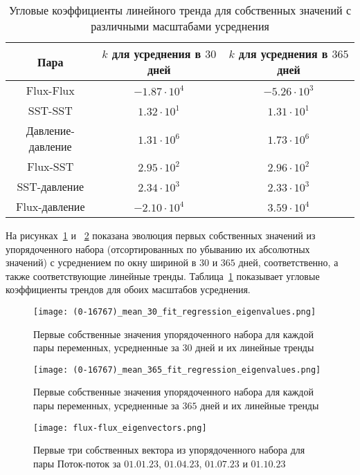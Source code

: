 \begin{table}
	\caption{Угловые коэффициенты линейного тренда для собственных значений с различными масштабами усреднения }
	\centering
	\begin{tabular}{|c|c|c|}
		\hline
		Пара & $k$ для усреднения в $30$ дней & $k$ для усреднения в $365$ дней\\
		\hline
		Flux-Flux & $-1.87 \cdot 10^{4}$ & $-5.26 \cdot 10^{3}$ \\
		SST-SST & $1.32 \cdot 10^{1}$ & $1.31 \cdot 10^{1}$ \\
		Давление-давление & $1.31 \cdot 10^{6}$ & $1.73 \cdot 10^{6}$ \\
		Flux-SST & $2.95 \cdot 10^{2}$ & $2.96 \cdot 10^{2}$ \\
		SST-давление & $2.34 \cdot 10^{3}$ & $2.33 \cdot 10^{3}$ \\
		Flux-давление & $-2.10 \cdot 10^{4}$ & $3.59 \cdot 10^{4}$ \\
		\hline
	\end{tabular}
	\label{tab:angular_eigens}
\end{table}

На рисунках~\ref{fig:eigenvalues_mean_30} и ~\ref{fig:eigenvalues_mean_365} показана эволюция первых собственных значений из упорядоченного набора (отсортированных по убыванию их абсолютных значений) с усреднением по окну шириной в $30$ и $365$ дней, соответственно, а также соответствующие линейные тренды. Таблица~\ref{tab:angular_eigens} показывает угловые коэффициенты трендов для обоих масштабов усреднения.


\begin{figure}
	\centering
	\texttt{[image: (0-16767)\_mean\_30\_fit\_regression\_eigenvalues.png]}
	\caption{Первые собственные значения упорядоченного набора для каждой пары переменных, усредненные за $30$ дней и их линейные тренды}
	\label{fig:eigenvalues_mean_30}
\end{figure}

\begin{figure}
	\centering
	\texttt{[image: (0-16767)\_mean\_365\_fit\_regression\_eigenvalues.png]}
	\caption{Первые собственные значения упорядоченного набора для каждой пары переменных, усредненные за $365$ дней и их линейные тренды}
	\label{fig:eigenvalues_mean_365}
\end{figure}

\begin{figure}
	\centering
	\texttt{[image: flux-flux\_eigenvectors.png]}
	\caption{Первые три собственных вектора из упорядоченного набора для пары Поток-поток за $01.01.23$, $01.04.23$, $01.07.23$ и $01.10.23$}
	\label{fig:Flux-Flux_eigenvectors}
\end{figure}

